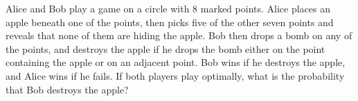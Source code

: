 Alice and Bob play a game on a circle with 8 marked points. Alice places an apple beneath one of the points, then picks five of the other seven points and reveals that none of them are hiding the apple. Bob then drops a bomb on any of the points, and destroys the apple if he drops the bomb either on the point containing the apple or on an adjacent point. Bob wins if he destroys the apple, and Alice wins if he fails.  If both players play optimally, what is the probability that Bob destroys the apple?